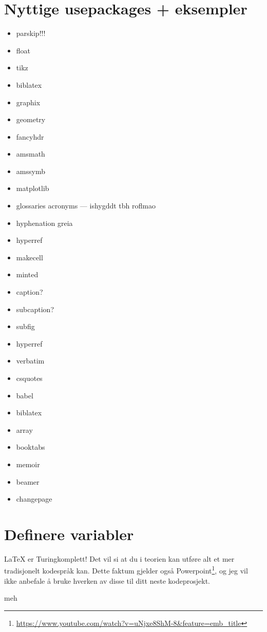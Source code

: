 \section{Nyttige usepackages + eksempler}
\begin{itemize}
    \item parskip!!!
    \item float
    \item tikz
    \item biblatex
    \item graphix
    \item geometry %
    \item fancyhdr
    \item amsmath
    \item amssymb
    \item matplotlib
    \item glossaries acronyms --- ishygddt tbh roflmao
    \item hyphenation greia
    \item hyperref
    \item makecell
    \item minted
    \item caption?
    \item subcaption?
    \item subfig
    \item hyperref %
    \item verbatim %
    \item csquotes %
    \item babel %
    \item biblatex 
    \item array
    \item booktabs
    \item memoir
    \item beamer
    \item changepage
\end{itemize}

\section{Definere variabler}
    \LaTeX{} er Turingkomplett! Det vil si at du i teorien kan utføre alt et mer tradisjonelt kodespråk kan. Dette faktum gjelder også Powerpoint\footnote{\url{https://www.youtube.com/watch?v=uNjxe8ShM-8&feature=emb_title}}, og jeg vil ikke anbefale å bruke hverken av disse til ditt neste kodeprosjekt.
    
    
    \if
        meh 
    \fi
    
